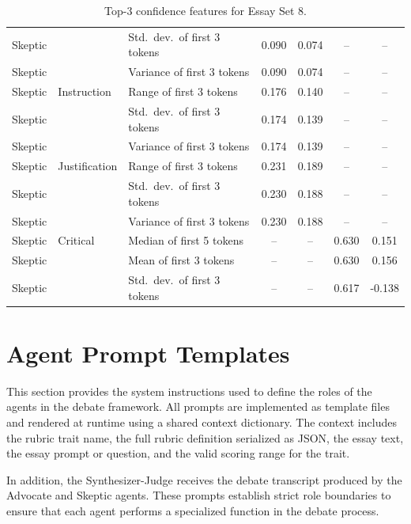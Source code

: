 \documentclass[11pt]{article}
\begin{document}
\begin{table}[t]
\begin{tabular}{l l l c c c c}
Skeptic  &               & Std.\ dev.\ of first 3 tokens & 0.090 & 0.074 & -- & -- \\
Skeptic  &               & Variance of first 3 tokens & 0.090 & 0.074 & -- & -- \\
\midrule
Skeptic  & Instruction   & Range of first 3 tokens & 0.176 & 0.140 & -- & -- \\
Skeptic  &               & Std.\ dev.\ of first 3 tokens & 0.174 & 0.139 & -- & -- \\
Skeptic  &               & Variance of first 3 tokens & 0.174 & 0.139 & -- & -- \\
\midrule
Skeptic  & Justification & Range of first 3 tokens & 0.231 & 0.189 & -- & -- \\
Skeptic  &               & Std.\ dev.\ of first 3 tokens & 0.230 & 0.188 & -- & -- \\
Skeptic  &               & Variance of first 3 tokens & 0.230 & 0.188 & -- & -- \\
\midrule
Skeptic  & Critical      & Median of first 5 tokens & -- & -- & 0.630 & 0.151 \\
Skeptic  &               & Mean of first 3 tokens   & -- & -- & 0.630 & 0.156 \\
Skeptic  &               & Std.\ dev.\ of first 3 tokens & -- & -- & 0.617 & -0.138 \\
\bottomrule
\end{tabular}
\caption{Top-3 confidence features for Essay Set 8.}
\label{tab:set8-top3-full}
\end{table}



\section{Agent Prompt Templates}
\label{app:prompts}

This section provides the system instructions used to define the roles of the agents in the debate framework. 
All prompts are implemented as template files and rendered at runtime using a shared context dictionary. 
The context includes the rubric trait name, the full rubric definition serialized as JSON, the essay text, 
the essay prompt or question, and the valid scoring range for the trait.

In addition, the Synthesizer-Judge receives the debate transcript produced by the Advocate and Skeptic agents. 
These prompts establish strict role boundaries to ensure that each agent performs a specialized function in the debate process.
\end{document}

